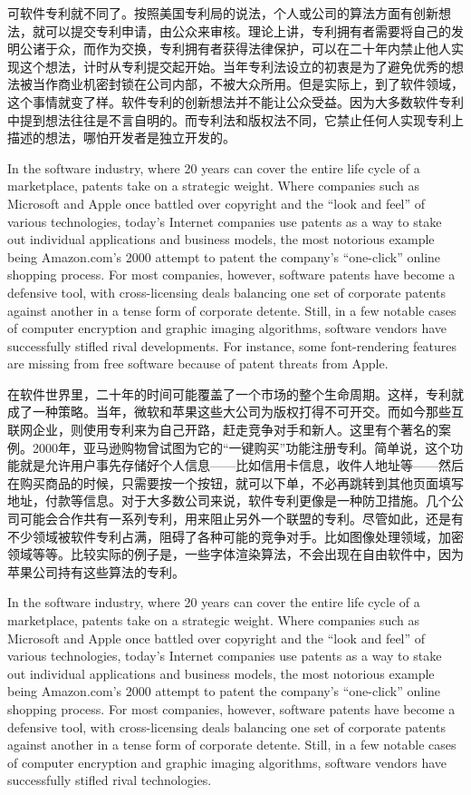 \ifdefined\chs
可软件专利就不同了。按照美国专利局的说法，个人或公司的算法方面有创新想法，就可以提交专利申请，由公众来审核。理论上讲，专利拥有者需要将自己的发明公诸于众，而作为交换，专利拥有者获得法律保护，可以在二十年内禁止他人实现这个想法，计时从专利提交起开始。当年专利法设立的初衷是为了避免优秀的想法被当作商业机密封锁在公司内部，不被大众所用。但是实际上，到了软件领域，这个事情就变了样。软件专利的创新想法并不能让公众受益。因为大多数软件专利中提到想法往往是不言自明的。而专利法和版权法不同，它禁止任何人实现专利上描述的想法，哪怕开发者是独立开发的。
\fi
\fi


\ifdefined\vtwo
\ifdefined\eng
In the software industry, where 20 years can cover the entire life cycle of a marketplace, patents take on a strategic weight. Where companies such as Microsoft and Apple once battled over copyright and the ``look and feel'' of various technologies, today's Internet companies use patents as a way to stake out individual applications and business models, the most notorious example being Amazon.com's 2000 attempt to patent the company's ``one-click'' online shopping process. For most companies, however, software patents have become a defensive tool, with cross-licensing deals balancing one set of corporate patents against another in a tense form of corporate detente. Still, in a few notable cases of computer encryption and graphic imaging algorithms, software vendors have successfully stifled rival developments.  For instance, some font-rendering features are missing from free software because of patent threats from Apple.
\fi

\ifdefined\chs
在软件世界里，二十年的时间可能覆盖了一个市场的整个生命周期。这样，专利就成了一种策略。当年，微软和苹果这些大公司为版权打得不可开交。而如今那些互联网企业，则使用专利来为自己开路，赶走竞争对手和新人。这里有个著名的案例。2000年，亚马逊购物曾试图为它的``一键购买''功能注册专利。简单说，这个功能就是允许用户事先存储好个人信息——比如信用卡信息，收件人地址等——然后在购买商品的时候，只需要按一个按钮，就可以下单，不必再跳转到其他页面填写地址，付款等信息。对于大多数公司来说，软件专利更像是一种防卫措施。几个公司可能会合作共有一系列专利，用来阻止另外一个联盟的专利。尽管如此，还是有不少领域被软件专利占满，阻碍了各种可能的竞争对手。比如图像处理领域，加密领域等等。比较实际的例子是，一些字体渲染算法，不会出现在自由软件中，因为苹果公司持有这些算法的专利。
\fi
\fi

\ifdefined\vone
\ifdefined\eng
In the software industry, where 20 years can cover the entire life cycle of a marketplace, patents take on a strategic weight. Where companies such as Microsoft and Apple once battled over copyright and the ``look and feel'' of various technologies, today's Internet companies use patents as a way to stake out individual applications and business models, the most notorious example being Amazon.com's 2000 attempt to patent the company's ``one-click'' online shopping process. For most companies, however, software patents have become a defensive tool, with cross-licensing deals balancing one set of corporate patents against another in a tense form of corporate detente. Still, in a few notable cases of computer encryption and graphic imaging algorithms, software vendors have successfully stifled rival technologies.
\fi

